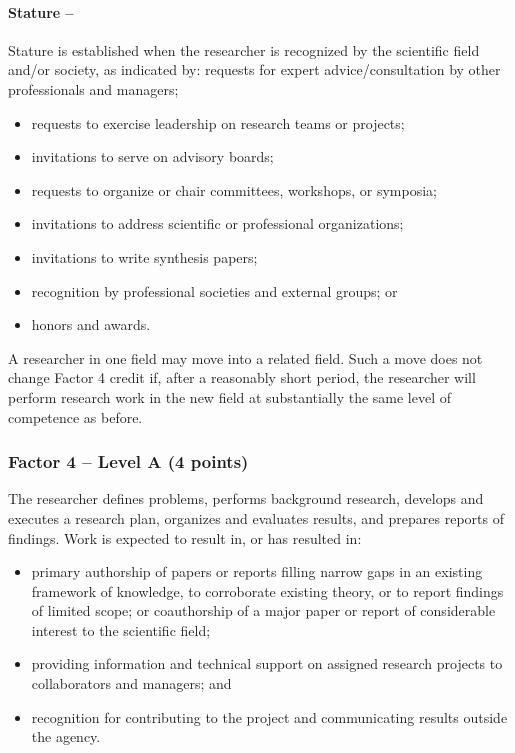 \paragraph{Stature -- }Stature is established when the researcher is recognized by the scientific field and/or
society, as indicated by: 
requests for expert advice/consultation by other professionals and managers; 
\begin{itemize}
\item requests to exercise leadership on research teams or projects; 
\item invitations to serve on advisory boards; 
\item requests to organize or chair committees, workshops, or symposia; 
\item invitations to address scientific or professional organizations; 
\item invitations to write synthesis papers; 
\item recognition by professional societies and external groups; or 
\item  honors and awards. 
\end{itemize}

A researcher in one field may move into a related field. Such a move does not change Factor 4 credit if, after a reasonably short period, the researcher will perform research work in the new  field at substantially the same level of competence as before.

\subsubsection*{Factor 4 -- Level A (4 points)}

The researcher defines problems, performs background research, develops and executes a research plan, organizes and evaluates results, and prepares reports of findings.
Work is expected to result in, or has resulted in: 
\begin{itemize}
  \item primary authorship of papers or reports filling narrow gaps in an existing framework of knowledge, to corroborate existing theory, or to report findings of limited scope; or coauthorship of a major paper or report of considerable interest to the scientific field;
  \item providing information and technical support on assigned research projects to collaborators and managers; and
  \item recognition for contributing to the project and communicating results outside the agency. 
\end{itemize}

